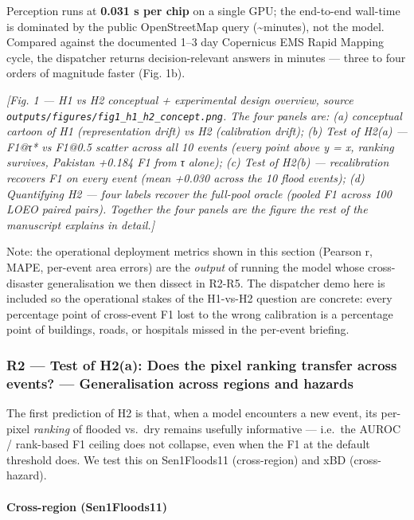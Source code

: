 Perception runs at \textbf{0.031 s per chip} on a single GPU; the end-to-end
wall-time is dominated by the public OpenStreetMap query (\textasciitilde minutes), not the
model. Compared against the documented 1--3 day Copernicus EMS Rapid Mapping
cycle, the dispatcher returns decision-relevant answers in minutes --- three to
four orders of magnitude faster (Fig. 1b).

\emph{{[}Fig. 1 --- H1 vs H2 conceptual + experimental design overview, source
\texttt{outputs/figures/fig1\_h1\_h2\_concept.png}. The four panels are:
(a) conceptual cartoon of H1 (representation drift) vs H2 (calibration
drift); (b) Test of H2(a) --- F1@τ* vs F1@0.5 scatter across all 10
events (every point above y = x, ranking survives, Pakistan +0.184 F1
from τ alone); (c) Test of H2(b) --- recalibration recovers F1 on every
event (mean +0.030 across the 10 flood events); (d) Quantifying H2 ---
four labels recover the full-pool oracle (pooled F1 across 100 LOEO
paired pairs). Together the four panels are the figure the rest of the
manuscript explains in detail.{]}}

Note: the operational deployment metrics shown in this section
(Pearson r, MAPE, per-event area errors) are the \emph{output} of running
the model whose cross-disaster generalisation we then dissect in R2-R5.
The dispatcher demo here is included so the operational stakes of the
H1-vs-H2 question are concrete: every percentage point of cross-event
F1 lost to the wrong calibration is a percentage point of buildings,
roads, or hospitals missed in the per-event briefing.

\subsubsection{R2 --- Test of H2(a): Does the pixel ranking transfer across events? --- Generalisation across regions and hazards}\label{r2-test-of-h2a-does-the-pixel-ranking-transfer-across-events-generalisation-across-regions-and-hazards}

The first prediction of H2 is that, when a model encounters a new event,
its per-pixel \emph{ranking} of flooded vs.~dry remains usefully informative ---
i.e.~the AUROC / rank-based F1 ceiling does not collapse, even when the
F1 at the default threshold does. We test this on Sen1Floods11
(cross-region) and xBD (cross-hazard).

\paragraph{Cross-region (Sen1Floods11)}\label{cross-region-sen1floods11}

